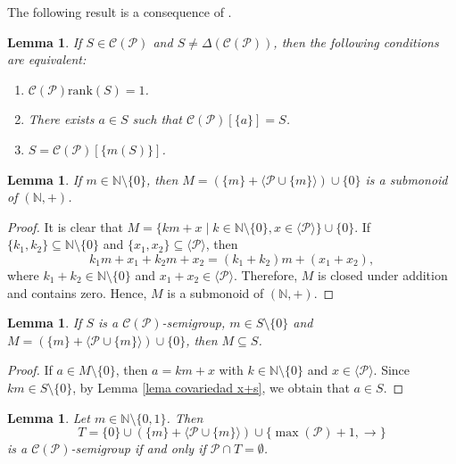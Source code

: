 \documentclass[11pt]{article}
\def\N{\mathbb{N}}
\newtheorem{lemma}[theorem]{Lemma}
\numberwithin{equation}{section}
\newcommand{\CP}{\mathcal C(\mathcal P)}
\newcommand{\rk}{\mathrm{rank}}
\begin{document}
The following result is a consequence of \cite[Proposition 6.3]{covariedades}.

\begin{lemma}\label{lema caracterizancion rango 1}
    If $S\in\mathcal C(\mathcal P)$ and $S\ne\Delta(\mathcal C(\mathcal P))$, then the following conditions are equivalent:
    \begin{enumerate}
        \item $\CP\rk(S)=1$.
        \item There exists $a\in S$ such that $\mathcal C(\mathcal P)[\{a\}]=S$.
        \item $S=\mathcal C(\mathcal P)[\{m(S)\}]$.
    \end{enumerate}
\end{lemma}

\begin{lemma}\label{lema M es submonoide}
    If $m\in \N\setminus\{0\}$, then $M=(\{m\}+\langle\mathcal P\cup\{m\}\rangle)\cup\{0\}$ is a submonoid of $(\N,+)$.
\end{lemma}

\begin{proof}
    It is clear that $M=\{km+x\mid k\in\N\setminus\{0\}, x\in\langle\mathcal P\rangle\}\cup\{0\}$. If $\{k_1,k_2\}\subseteq\N\setminus\{0\}$ and $\{x_1,x_2\}\subseteq\langle\mathcal P\rangle$, then
    \[
    k_1m+x_1+k_2m+x_2=(k_1+k_2)m+(x_1+x_2),
    \]
    where $k_1+k_2\in\mathbb N\setminus\{0\}$ and $x_1+x_2\in\langle\mathcal P\rangle$. Therefore, $M$ is closed under addition and contains zero. Hence, $M$ is a submonoid of $(\N,+)$.
\end{proof}

\begin{lemma}\label{lema M contenido en S}
    If $S$ is a $\mathcal C(\mathcal P)$-semigroup, $m\in S\setminus\{0\}$ and $M=(\{m\}+\langle\mathcal P\cup\{m\}\rangle)\cup\{0\}$, then $M\subseteq S$.
\end{lemma}

\begin{proof}
    If $a\in M\setminus\{0\}$, then $a=km+x$ with $k\in\N\setminus\{0\}$ and $x\in\langle\mathcal P\rangle$. Since $km\in S\setminus\{0\}$, by Lemma \ref{lema covariedad x+s}, we obtain that $a\in S$.
\end{proof}

\begin{lemma}\label{lema caracterizacion T}
    Let $m\in\N\setminus\{0,1\}$. Then
    \[
    T=\{0\}\cup(\{m\}+\langle\mathcal P\cup\{m\}\rangle)\cup\{\max(\mathcal P)+1,\rightarrow\}
    \]
    is a $\mathcal{C}(\mathcal P)$-semigroup if and only if $\mathcal P\cap T=\emptyset$.
\end{lemma}
\end{document}
